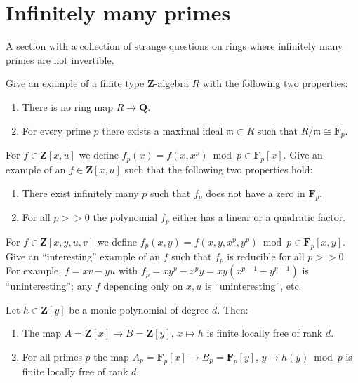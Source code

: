 \section{Infinitely many primes}
\label{section-many-primes}

\noindent
A section with a collection of strange questions on rings where
infinitely many primes are not invertible.

\begin{exercise}
\label{exercise-not-in-Q}
Give an example of a finite type ${\mathbf Z}$-algebra $R$
with the following two properties:
\begin{enumerate}
\item There is no ring map $R \to {\mathbf Q}$.
\item For every prime $p$ there exists a maximal ideal
${\mathfrak m} \subset R$ such that $R/{\mathfrak m} \cong {\mathbf F}_p$.
\end{enumerate}
\end{exercise}

\begin{exercise}
\label{exercise-strange-fp-1}
For $f \in {\mathbf Z}[x, u]$ we define $f_p(x)
= f(x, x^p) \bmod p \in {\mathbf F}_p[x]$. Give an example
of an $f \in {\mathbf Z}[x, u]$ such that the following two
properties hold:
\begin{enumerate}
\item There exist infinitely many $p$ such that $f_p$
does not have a zero in ${\mathbf F}_p$.
\item For all $p>>0$ the polynomial $f_p$ either has
a linear or a quadratic factor.
\end{enumerate}
\end{exercise}

\begin{exercise}
\label{exercise-strange-fp-2}
For $f \in {\mathbf Z}[x, y, u, v]$ we define $f_p(x, y)
= f(x, y, x^p, y^p) \bmod p \in {\mathbf F}_p[x, y]$. Give an ``interesting''
example of an $f$ such that $f_p$ is reducible for all $p>>0$.
For example, $f = xv-yu$ with $f_p = xy^p-x^py = xy(x^{p-1}-y^{p-1})$ is
``uninteresting''; any $f$ depending only on $x, u$ is ``uninteresting'',
etc.
\end{exercise}

\begin{remark}
\label{remark-strange-fp}
Let $h \in {\mathbf Z}[y]$ be a monic polynomial of degree $d$.
Then:
\begin{enumerate}
\item The map $A = {\mathbf Z}[x] \to B ={\mathbf Z}[y]$,
$x \mapsto h$ is finite locally free of rank $d$.
\item For all primes $p$ the map
$A_p = {\mathbf F}_p[x]\to B_p = {\mathbf F}_p[y]$,
$y \mapsto h(y) \bmod p$ is finite locally free of rank $d$.
\end{enumerate}
\end{remark}

